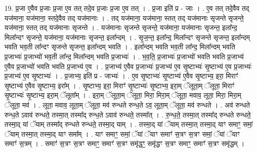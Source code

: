 \documentclass[17pt]{extarticle}
\begin{document}
19. प्र॒जा ए॒वैव प्र॒जाः प्र॒जा ए॒व तत् तदे॒व प्र॒जाः प्र॒जा ए॒व तत् । . प्र॒जा इति॑ प्र - जाः । . ए॒व तत् तदे॒वैव तद् यज॑माना॒ यज॑माना॒ स्तदे॒वैव तद् यज॑मानाः । . तद् यज॑माना॒ यज॑माना॒ स्तत् तद् यज॑मानाः सृजन्ते सृजन्ते॒ यज॑माना॒ स्तत् तद् यज॑मानाः सृजन्ते । . यज॑मानाः सृजन्ते सृजन्ते॒ यज॑माना॒ यज॑मानाः सृजन्त॒ इला᳚न्द॒ मिला᳚न्दꣳ सृजन्ते॒ यज॑माना॒ यज॑मानाः सृजन्त॒ इला᳚न्दम् । . सृ॒ज॒न्त॒ इला᳚न्द॒ मिला᳚न्दꣳ सृजन्ते सृजन्त॒ इला᳚न्दम् भवति भव॒ती ला᳚न्दꣳ सृजन्ते सृजन्त॒ इला᳚न्दम् भवति । . इला᳚न्दम् भवति भव॒ती ला᳚न्द॒ मिला᳚न्दम् भवति प्र॒जाभ्यः॑ प्र॒जाभ्यो॑ भव॒ती ला᳚न्द॒ मिला᳚न्दम् भवति प्र॒जाभ्यः॑ । . भ॒व॒ति॒ प्र॒जाभ्यः॑ प्र॒जाभ्यो॑ भवति भवति प्र॒जाभ्य॑ ए॒वैव प्र॒जाभ्यो॑ भवति भवति प्र॒जाभ्य॑ ए॒व । . प्र॒जाभ्य॑ ए॒वैव प्र॒जाभ्यः॑ प्र॒जाभ्य॑ ए॒व सृ॒ष्टाभ्यः॑ सृ॒ष्टाभ्य॑ ए॒व प्र॒जाभ्यः॑ प्र॒जाभ्य॑ ए॒व सृ॒ष्टाभ्यः॑ । . प्र॒जाभ्य॒ इति॑ प्र - जाभ्यः॑ । . ए॒व सृ॒ष्टाभ्यः॑ सृ॒ष्टाभ्य॑ ए॒वैव सृ॒ष्टाभ्य॒ इरा॒ मिराꣳ॑ सृ॒ष्टाभ्य॑ ए॒वैव सृ॒ष्टाभ्य॒ इरा᳚म् । . सृ॒ष्टाभ्य॒ इरा॒ मिराꣳ॑ सृ॒ष्टाभ्यः॑ सृ॒ष्टाभ्य॒ इरा॒म् ॅलूता॒म् ॅलूता॒ मिराꣳ॑ सृ॒ष्टाभ्यः॑ सृ॒ष्टाभ्य॒ इरा॒म् ॅलूता᳚म् । . इरा॒म् ॅलूता॒म् ॅलूता॒ मिरा॒ मिरा॒म् ॅलूता॒ मवाव॒ लूता॒ मिरा॒ मिरा॒म् ॅलूता॒ मव॑ । . लूता॒ मवाव॒ लूता॒म् ॅलूता॒ मव॑ रुन्धते रुन्ध॒ते ऽव॒ लूता॒म् ॅलूता॒ मव॑ रुन्धते । . अव॑ रुन्धते रुन्ध॒ते ऽवाव॑ रुन्धते॒ तस्मा॒त् तस्मा᳚द् रुन्ध॒ते ऽवाव॑ रुन्धते॒ तस्मा᳚त् । . रु॒न्ध॒ते॒ तस्मा॒त् तस्मा᳚द् रुन्धते रुन्धते॒ तस्मा॒द् यां ॅयाम् तस्मा᳚द् रुन्धते रुन्धते॒ तस्मा॒द् याम् । . तस्मा॒द् यां ॅयाम् तस्मा॒त् तस्मा॒द् याꣳ समाꣳ॒॒ समां॒ ॅयाम् तस्मा॒त् तस्मा॒द् याꣳ समा᳚म् । . याꣳ समाꣳ॒॒ समां॒ ॅयां ॅयाꣳ समाꣳ॑ स॒त्रꣳ स॒त्रꣳ समां॒ ॅयां ॅयाꣳ समाꣳ॑ स॒त्रम् । . समाꣳ॑ स॒त्रꣳ स॒त्रꣳ समाꣳ॒॒ समाꣳ॑ स॒त्रꣳ समृ॑द्धꣳ॒॒ समृ॑द्धꣳ स॒त्रꣳ समाꣳ॒॒ समाꣳ॑ स॒त्रꣳ समृ॑द्धम् । \newline
\end{document}
